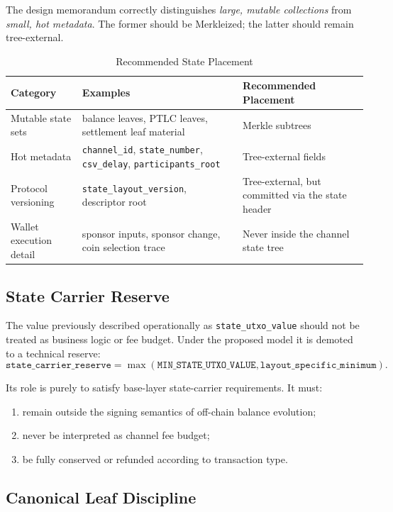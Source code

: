 \documentclass[11pt,a4paper]{article}
\newcommand{\code}[1]{\texttt{#1}}
\begin{document}
The design memorandum correctly distinguishes \emph{large, mutable collections} from \emph{small, hot metadata}. The former should be Merkleized; the latter should remain tree-external.

\begin{table}[htbp]
\centering
\caption{Recommended State Placement}
\label{tab:state_placement}
\small
\begin{tabularx}{\linewidth}{@{}l X X@{}}
\toprule
\textbf{Category} & \textbf{Examples} & \textbf{Recommended Placement} \\
\midrule
Mutable state sets & balance leaves, PTLC leaves, settlement leaf material & Merkle subtrees \\
Hot metadata & \code{channel\_id}, \code{state\_number}, \code{csv\_delay}, \code{participants\_root} & Tree-external fields \\
Protocol versioning & \code{state\_layout\_version}, descriptor root & Tree-external, but committed via the state header \\
Wallet execution detail & sponsor inputs, sponsor change, coin selection trace & Never inside the channel state tree \\
\bottomrule
\end{tabularx}
\end{table}

\subsection{State Carrier Reserve}

The value previously described operationally as \code{state\_utxo\_value} should not be treated as business logic or fee budget. Under the proposed model it is demoted to a technical reserve:
\[
\texttt{state\_carrier\_reserve} = \max(\texttt{MIN\_STATE\_UTXO\_VALUE}, \texttt{layout\_specific\_minimum}).
\]

Its role is purely to satisfy base-layer state-carrier requirements. It must:
\begin{enumerate}
    \item remain outside the signing semantics of off-chain balance evolution;
    \item never be interpreted as channel fee budget;
    \item be fully conserved or refunded according to transaction type.
\end{enumerate}

\subsection{Canonical Leaf Discipline}
\end{document}
